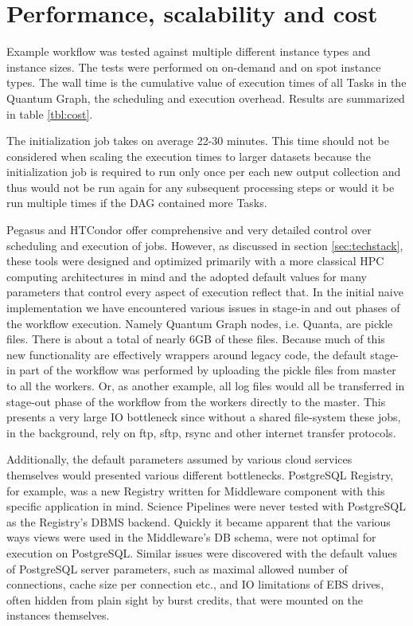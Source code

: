 \documentclass[a4paper, 10pt, conference]{ieeeconf}
\begin{document}
\section{Performance, scalability and cost}

Example workflow was tested against multiple different instance types and instance sizes. The tests were performed on on-demand and on spot instance types. The wall time is the cumulative value of execution times of all Tasks in the Quantum Graph, the scheduling and execution overhead. Results are summarized in table \ref{tbl:cost}.  

The initialization job takes on average 22-30 minutes. This time should not be considered when scaling the execution times to larger datasets because the initialization job is required to run only once per each new output collection and thus would not be run again for any subsequent processing steps or would it be run multiple times if the DAG contained more Tasks. 

Pegasus and HTCondor offer comprehensive and very detailed control over scheduling and execution of jobs. However, as discussed in section \ref{sec:techstack}, these tools were designed and optimized primarily with a more classical HPC computing architectures in mind and the adopted default values for many parameters that control every aspect of execution reflect that. In the initial naive implementation we have encountered various issues in stage-in and out phases of the workflow execution. Namely Quantum Graph nodes, i.e. Quanta, are pickle files. There is about a total of nearly 6GB of these files. Because much of this new functionality are effectively wrappers around legacy code, the default stage-in part of the workflow was performed by uploading the pickle files from master to all the workers. Or, as another example, all log files would all be transferred in stage-out phase of the workflow  from the workers directly to the master. This presents a very large IO bottleneck since without a shared file-system these jobs, in the background, rely on ftp, sftp, rsync and other internet transfer protocols. 

Additionally, the default parameters assumed by various cloud services themselves would presented various different bottlenecks. PostgreSQL Registry, for example, was a new Registry written for Middleware component with this specific application in mind. Science Pipelines were never tested with PostgreSQL as the Registry's DBMS backend. Quickly it became apparent that the various ways views were used in the Middleware's DB schema, were not optimal for execution on PostgreSQL. Similar issues were discovered with the default values of PostgreSQL server parameters, such as maximal allowed number of connections, cache size per connection etc., and IO limitations of EBS drives, often hidden from plain sight by burst credits,  that were mounted on the instances themselves. 
\end{document}
